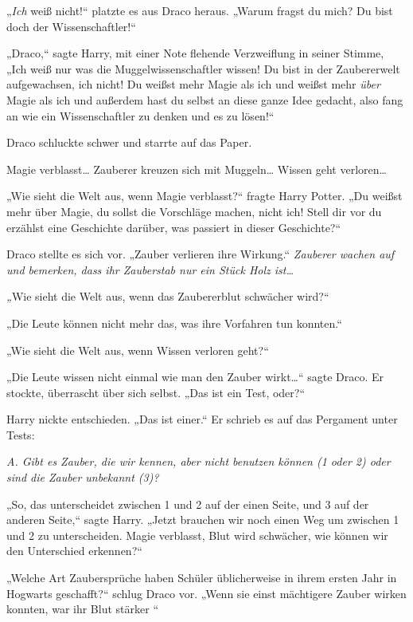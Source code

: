 {„\emph{Ich} weiß nicht!“ platzte es aus Draco heraus. „Warum fragst du mich? Du bist doch der Wissenschaftler!“

„Draco,“ sagte Harry, mit einer Note flehende Verzweiflung in seiner Stimme, „Ich weiß nur was die Muggelwissenschaftler wissen! Du bist in der Zaubererwelt aufgewachsen, ich nicht! Du weißst mehr Magie als ich und weißst mehr \emph{über} Magie als ich und außerdem hast du selbst an diese ganze Idee gedacht, also fang an wie ein Wissenschaftler zu denken und es zu lösen!“

Draco schluckte schwer und starrte auf das Paper.

Magie verblasst… Zauberer kreuzen sich mit Muggeln… Wissen geht verloren…

„Wie sieht die Welt aus, wenn Magie verblasst?“ fragte Harry Potter. „Du weißst mehr über Magie, du sollst die Vorschläge machen, nicht ich! Stell dir vor du erzählst eine Geschichte darüber, was passiert in dieser Geschichte?“

Draco stellte es sich vor. „Zauber verlieren ihre Wirkung.“ \emph{Zauberer wachen auf und bemerken, dass ihr Zauberstab nur ein Stück Holz ist…}

\emph{„}Wie sieht die Welt aus, wenn das Zaubererblut schwächer wird?“

„Die Leute können nicht mehr das, was ihre Vorfahren tun konnten.“

„Wie sieht die Welt aus, wenn Wissen verloren geht?“

„Die Leute wissen nicht einmal wie man den Zauber wirkt…“ sagte Draco. Er stockte, überrascht über sich selbst. „Das ist ein Test, oder?“

Harry nickte entschieden. „Das ist einer.“ Er schrieb es auf das Pergament unter Tests:

\emph{A. Gibt es Zauber, die wir kennen, aber nicht benutzen können (1 oder 2) oder sind die Zauber unbekannt (3)?}

„So, das unterscheidet zwischen 1 und 2 auf der einen Seite, und 3 auf der anderen Seite,“ sagte Harry. „Jetzt brauchen wir noch einen Weg um zwischen 1 und 2 zu unterscheiden. Magie verblasst, Blut wird schwächer, wie können wir den Unterschied erkennen?“

„Welche Art Zaubersprüche haben Schüler üblicherweise in ihrem ersten Jahr in Hogwarts geschafft?“ schlug Draco vor. „Wenn sie einst mächtigere Zauber wirken konnten, war ihr Blut stärker \later“

}
